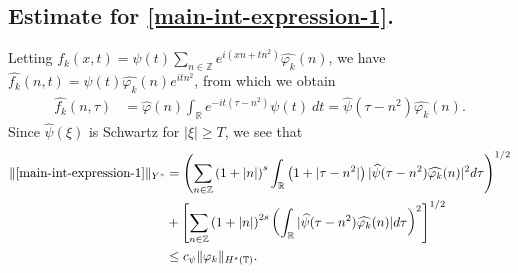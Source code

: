 \documentclass[12pt,reqno]{amsart}
\numberwithin{equation}{section}  %
\numberwithin{figure}{section}
\newcommand{\rr}{\mathbb{R}}
\newcommand{\zz}{\mathbb{Z}}
\newcommand{\ci}{\mathbb{T}}
\newcommand{\wh}{\widehat}
\newcommand{\vp}{\varphi}
\theoremstyle{plain}
\theoremstyle{definition}
\theoremstyle{remark}
\begin{document}
\subsection{Estimate for \eqref{main-int-expression-1}.}
Letting $f_k(x,t) = \psi(t) \sum_{n \in \zz} e^{i(xn + tn^{2})} 
\wh{\vp_k}(n)$, we have $\wh{f_k}(n,t) = \psi(t) \wh{\vp_k}(n) e^{itn^{2}}$,
from which we obtain
%
%
\begin{equation*}
  \begin{split}
    \wh{f_k}(n, \tau)
    & = \wh{\vp}(n) \int_\rr e^{-it( \tau - n^{2})} 
    \psi(t) \ d t
    = \wh{\psi}(\tau - n^{2}) \wh{\vp_k}(n).
  \end{split}
\end{equation*}
%
%
Since $\wh{\psi}(\xi)$ is Schwartz for $|\xi| \ge T$, we see that 
%
%
\begin{equation}
  \begin{split}
  \label{main-int1-est}
    \|\eqref{main-int-expression-1}\|_{Y^s}
    & = \left (  \sum_{n\in \zz} \left (1 + |n| \right )^s \int_\rr \left( 1 + | \tau - n^{2} 
    | \right )
    | \wh{\psi}(\tau - n^{2}) \wh{\vp_k}(n) |^2 d \tau \right)^{1/2} 
    \\
    & + \left[ \sum_{n \in \zz }\left( 1 + | n | \right)^{2s} \left( \int_{\rr} |
    \wh{\psi}(\tau - n^{2})\wh{\vp_k}(n) | d \tau
    \right)^{2} \right]^{1/2}
    \\
    & \le c_{\psi}
    \|\vp_k\|_{H^s(\ci)}.
  \end{split}
\end{equation}
%
%
%
%
\end{document}
